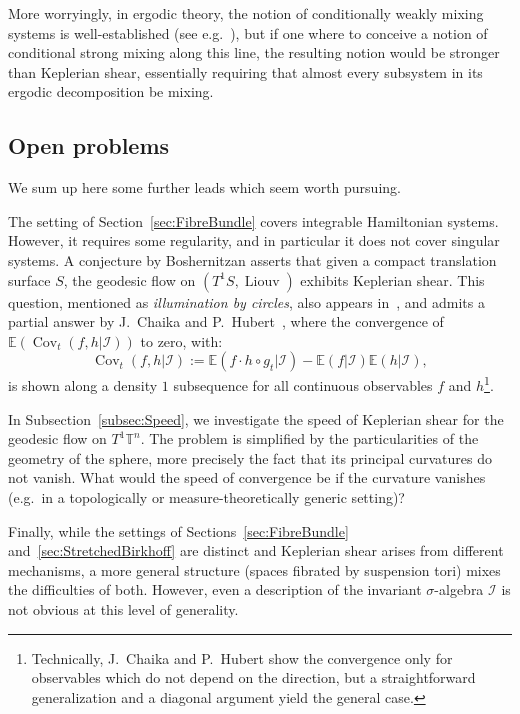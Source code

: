 \documentclass[10pt]{amsart}
\theoremstyle{definition}\newtheorem{defi}[theo]{Definition}\newtheorem{rema}[theo]{Remark}\newtheorem{exam}[theo]{Example}\newtheorem{exem}[theo]{Example}\newtheorem{nota}[theo]{Notation}
\DeclareMathOperator{\Cov}{Cov}
\DeclareMathOperator{\Liouv}{Liouv}
\newcommand{\Ebb}{\mathbb{E}}
\newcommand{\Tbb}{\mathbb{T}}
\newcommand{\Ical}{\mathcal{I}}
\begin{document}

More worryingly, in ergodic theory, the notion of conditionally weakly mixing systems is well-established (see e.g.~\cite{Tao:2008}), but if one where to conceive a notion of conditional strong mixing along this line, the resulting notion would be stronger than Keplerian shear, essentially requiring that almost every subsystem in its ergodic decomposition be mixing.


\subsection{Open problems}

We sum up here some further leads which seem worth pursuing.


The setting of Section~\ref{sec:FibreBundle} covers integrable Hamiltonian systems. However, it requires some regularity, and in particular it does not cover singular systems. A conjecture by Boshernitzan asserts that given a compact translation surface $S$, the geodesic flow on $(T^1 S, \Liouv)$ exhibits Keplerian shear. This question, mentioned as \emph{illumination by circles}, also appears in~\cite{Monteil:2005}, and admits a partial answer by J.~Chaika and P.~Hubert~\cite{ChaikaHubert:2015}, where the convergence of $\Ebb (\Cov_t (f, h|\Ical))$ to zero, with:
\[
\Cov_t (f, h|\Ical) := \Ebb (f \cdot h \circ g_t|\Ical) - \Ebb (f |\Ical)\Ebb (h|\Ical),
\]
is shown along a density $1$ subsequence for all continuous observables $f$ and $h$\footnote{Technically, J.~Chaika and P.~Hubert show the convergence only for observables which do not depend on the direction, but a straightforward generalization and a diagonal argument yield the general case.}.


In Subsection~\ref{subsec:Speed}, we investigate the speed of Keplerian shear for the geodesic flow on $T^1 \Tbb^n$. The problem is simplified by the particularities of the geometry of the sphere, more precisely the fact that its principal curvatures do not vanish. What would the speed of convergence be if the curvature vanishes (e.g.~in a topologically or measure-theoretically generic setting)?


Finally, while the settings of Sections~\ref{sec:FibreBundle} and~\ref{sec:StretchedBirkhoff} are distinct and Keplerian shear arises from different mechanisms, a more general structure (spaces fibrated by suspension tori) mixes the difficulties of both. However, even a description of the invariant $\sigma$-algebra $\Ical$ is not obvious at this level of generality.
\end{document}
